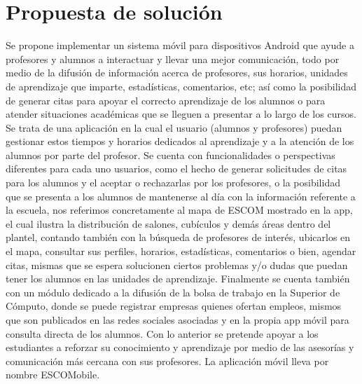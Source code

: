 \section{Propuesta de solución}

\noindent
Se propone implementar un sistema móvil para dispositivos Android que ayude a profesores y alumnos a interactuar y llevar una mejor 
comunicación, todo por medio de la difusión de información acerca de profesores, sus horarios, unidades de aprendizaje que imparte, estadísticas, comentarios, etc; así como la posibilidad de generar citas para apoyar el correcto aprendizaje de los 
alumnos o para atender situaciones académicas que se lleguen a presentar a lo largo de los cursos.
\newline
\newline
Se trata de una aplicación en la cual el usuario (alumnos y profesores) puedan gestionar estos tiempos y horarios dedicados al aprendizaje y a la atención de los alumnos por parte del profesor. Se cuenta con funcionalidades o perspectivas diferentes para cada uno usuarios, como
el hecho de generar solicitudes de citas para los alumnos y el aceptar o rechazarlas por los profesores, o la posibilidad que se presenta a los alumnos de mantenerse al día con la información referente a la escuela, nos referimos concretamente al mapa de ESCOM mostrado en la app, el cual ilustra la distribución de salones, cubículos y demás áreas dentro del plantel, contando también con la búsqueda de profesores de interés, ubicarlos en el mapa, consultar sus perfiles, horarios, estadísticas, comentarios o bien, agendar citas, mismas que se espera solucionen ciertos problemas y/o dudas que puedan tener los alumnos en las unidades de aprendizaje. Finalmente se cuenta también con un módulo dedicado a la difusión de la bolsa de trabajo en la Superior de Cómputo, donde se puede registrar empresas quienes ofertan empleos, mismos que son publicados en las redes sociales asociadas y en la propia app móvil para consulta directa de los alumnos.
\newline
\newline
Con lo anterior se pretende apoyar a los estudiantes a reforzar su conocimiento y aprendizaje por medio de las asesorías y comunicación más cercana con sus profesores. La aplicación móvil lleva por nombre ESCOMobile.